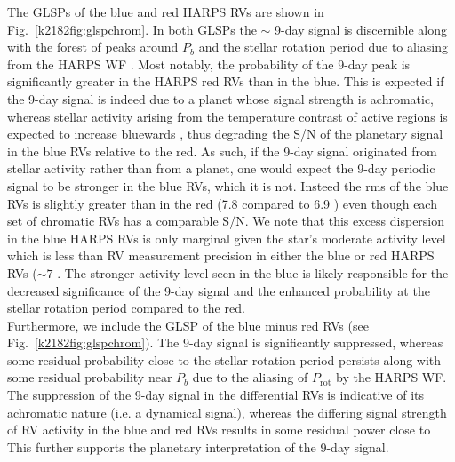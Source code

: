 The GLSPs of the blue and red HARPS RVs are shown in Fig.~\ref{k2182fig:glspchrom}.
In both GLSPs the $\sim$ 9-day signal is discernible along with the forest of peaks around $P_b$ and the stellar
rotation period due to aliasing from the HARPS WF .
Most notably, the probability of the 9-day peak is significantly greater in the HARPS red RVs than in the blue.
This is expected if the 9-day signal is indeed due to a
planet whose signal strength is achromatic, whereas stellar activity arising from the temperature contrast of active
regions is expected to increase bluewards \citep{reiners10}, thus degrading the S/N of the planetary signal in the blue
RVs relative to the red. As such, if the 9-day signal  originated from stellar activity rather than from a
planet, one would expect the 9-day periodic signal to be stronger in the blue RVs, which it is not.
Insteed the rms of the blue RVs is slightly greater than in the red (7.8 \mps{} compared to 6.9 \mps{})
even though each set of chromatic RVs has a comparable S/N. We note that this excess dispersion in the blue HARPS RVs is
only marginal given the star's moderate activity level 
which is less than RV measurement precision in either the blue or red HARPS RVs ($\sim 7$ \mps{)}.
The stronger activity level seen in the blue is likely responsible for the decreased significance
of the 9-day signal and the enhanced probability at the stellar rotation period compared to the red. \\

Furthermore, we include the GLSP of the blue minus red RVs (see Fig.~\ref{k2182fig:glspchrom}). The 
9-day signal is significantly suppressed, whereas some residual probability close to the stellar rotation period persists
along with some residual probability near $P_b$ due to the aliasing of $P_{\text{rot}}$ by the HARPS WF.
The suppression of the 9-day signal in the differential RVs is indicative of its achromatic nature
(i.e. a dynamical signal), whereas the differing signal strength of RV activity in the blue and red RVs results in some
residual power close to  This further supports the planetary interpretation of the 9-day signal. 

